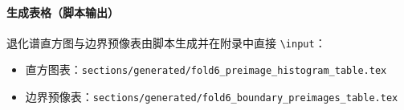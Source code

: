 \paragraph{生成表格（脚本输出）}
退化谱直方图与边界预像表由脚本生成并在附录中直接 \texttt{\textbackslash input}：
\begin{itemize}
  \item 直方图表：\texttt{sections/generated/fold6\_preimage\_histogram\_table.tex}
  \item 边界预像表：\texttt{sections/generated/fold6\_boundary\_preimages\_table.tex}
\end{itemize}

